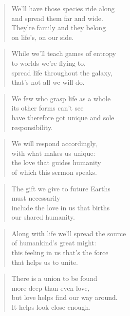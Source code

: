 \documentclass[10pt,a4paper]{article}
\begin{document}
\begin{multicols}{2}
\begin{verse}
We’ll have those species ride along\\
and spread them far and wide.\\
They’re family and they belong\\
on life’s, on our side.
\end{verse}

\begin{verse}
While we’ll teach games of entropy\\
to worlds we’re flying to,\\
spread life throughout the galaxy,\\
that’s not all we will do.
\end{verse}

\begin{verse}
We few who grasp life as a whole\\
its other forms can’t see\\
have therefore got unique and sole\\
responsibility.
\end{verse}

\begin{verse}
We will respond accordingly,\\
with what makes us unique:\\
the love that guides humanity\\
of which this sermon speaks.\\
\end{verse}

\begin{verse}
The gift we give to future Earths\\
must necessarily\\
include the love in us that births\\
our shared humanity.
\end{verse}

\begin{verse}
Along with life we’ll spread the source\\
of humankind’s great might:\\
this feeling in us that’s the force\\
that helps us to unite.
\end{verse}

\begin{verse}
There is a union to be found\\
more deep than even love,\\
but love helps find our way around.\\
It helps look close enough.
\end{verse}


\end{multicols}
\end{document}
